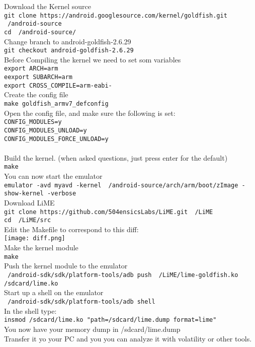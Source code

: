   Download the Kernel source\\
  \texttt{\justify git clone https://android.googlesource.com/kernel/goldfish.git ~/android-source} \\
  \texttt{\justify cd ~/android-source/} \\
  Change branch to android-goldfish-2.6.29\\
  \texttt{\justify git checkout android-goldfish-2.6.29} \\
  Before Compiling the kernel we need to set som variables\\
  \texttt{\justify export ARCH=arm} \\
  \texttt{\justify eexport SUBARCH=arm} \\
  \texttt{\justify export CROSS\_COMPILE=arm-eabi-} \\
  Create the config file\\
  \texttt{\justify make goldfish\_armv7\_defconfig} \\
  Open the config file, and make sure the following is set:\\
  \texttt{\justify CONFIG\_MODULES=y\\ CONFIG\_MODULES\_UNLOAD=y\\ CONFIG\_MODULES\_FORCE\_UNLOAD=y\\ } \\
  Build the kernel. (when asked questions, just press enter for the default)\\
  \texttt{\justify make} \\
  You can now start the emulator\\
  \texttt{\justify emulator -avd myavd -kernel ~/android-source/arch/arm/boot/zImage -show-kernel -verbose} \\
  Download LiME\\
  \texttt{\justify git clone https://github.com/504ensicsLabs/LiME.git ~/LiME} \\
  \texttt{\justify cd ~/LiME/src} \\
  Edit the Makefile to correspond to this diff:\\
  \texttt{[image: diff.png]} \\
  Make the kernel module\\
  \texttt{\justify make} \\
  Push the kernel module to the emulator\\
  \texttt{\justify ~/android-sdk/sdk/platform-tools/adb push ~/LiME/lime-goldfish.ko /sdcard/lime.ko} \\
  Start up a shell on the emulator\\
  \texttt{\justify ~/android-sdk/sdk/platform-tools/adb shell} \\
  In the shell type:\\
  \texttt{\justify insmod /sdcard/lime.ko "path=/sdcard/lime.dump format=lime"} \\
  You now have your memory dump in /sdcard/lime.dump\\
  Transfer it yo your PC and you you can analyze it with volatility or other tools.
  
  

